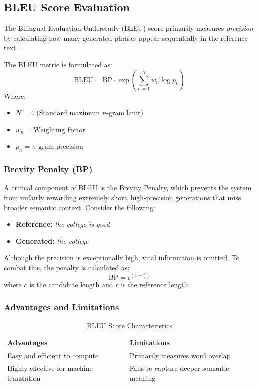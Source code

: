 \documentclass[10pt, conference]{IEEEtran}
\begin{document}
\subsection{\textbf{BLEU Score Evaluation}}
The Bilingual Evaluation Understudy (BLEU) score primarily measures \textit{precision} by calculating how many generated phrases appear sequentially in the reference text.

The BLEU metric is formulated as:
\begin{equation}
    \text{BLEU} = \text{BP} \cdot \exp\left( \sum_{n=1}^{N} w_n \log p_n \right)
\end{equation}
Where:
\begin{itemize}
    \item $N = 4$ (Standard maximum $n$-gram limit)
    \item $w_n = \text{Weighting factor}$
    \item $p_n = n\text{-gram precision}$
\end{itemize}

\subsubsection{\textbf{Brevity Penalty (BP)}}
A critical component of BLEU is the Brevity Penalty, which prevents the system from unfairly rewarding extremely short, high-precision generations that miss broader semantic context. Consider the following:
\begin{itemize}
    \item \textbf{Reference:} \textit{the college is good}
    \item \textbf{Generated:} \textit{the college}
\end{itemize}
Although the precision is exceptionally high, vital information is omitted. To combat this, the penalty is calculated as:
\begin{equation}
    \text{BP} = e^{\left(1 - \frac{r}{c}\right)}
\end{equation}
where $c$ is the candidate length and $r$ is the reference length.

\subsubsection{\textbf{Advantages and Limitations}}
\begin{table}[h]
\centering
\caption{BLEU Score Characteristics}
\begin{tabular}{p{4cm}p{4cm}}
\toprule
\textbf{Advantages} & \textbf{Limitations} \\
\midrule
Easy and efficient to compute & Primarily measures word overlap \\
Highly effective for machine translation & Fails to capture deeper semantic meaning \\
\bottomrule
\end{tabular}
\end{table}
\end{document}

